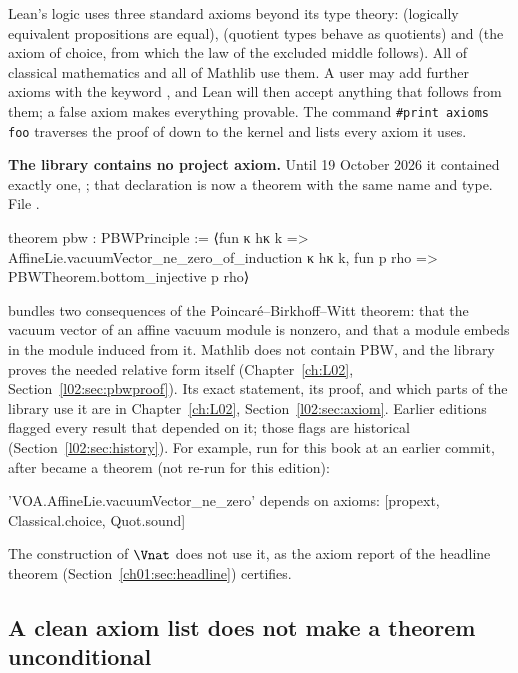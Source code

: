 Lean's logic uses three standard axioms beyond its type theory:  (logically equivalent
propositions are equal),  (quotient types behave as quotients) and
 (the axiom of choice, from which the law of the excluded middle follows).
All of classical mathematics and all of Mathlib use them. A user may add further axioms with the
keyword , and Lean will then accept anything that follows from them; a false axiom makes
everything provable. The command \texttt{\#print axioms foo} traverses the proof of  down
to the kernel and lists every axiom it uses.

\textbf{The library contains no project axiom.} Until 19 October 2026 it
contained exactly one, ; that declaration is now a theorem with the same name and type.
\noindent File .
\begin{leancode}
theorem pbw : PBWPrinciple :=
  ⟨fun κ hκ k => AffineLie.vacuumVector_ne_zero_of_induction κ hκ k,
    fun p rho => PBWTheorem.bottom_injective p rho⟩
\end{leancode}
 bundles two consequences of the Poincar\'e--Birkhoff--Witt theorem: that the
vacuum vector of an affine vacuum module is nonzero, and that a module embeds in the module induced
from it. Mathlib does not contain PBW, and the library proves the needed relative form itself
(Chapter~\ref{ch:L02}, Section~\ref{l02:sec:pbwproof}). Its exact statement, its proof, and which
parts of the library use it are in Chapter~\ref{ch:L02}, Section~\ref{l02:sec:axiom}. Earlier
editions flagged every result that depended on it; those flags are historical
(Section~\ref{l02:sec:history}). For example, run for this book at an earlier commit, after  became a theorem (not re-run for this edition):
\begin{plaincode}
'VOA.AffineLie.vacuumVector_ne_zero' depends on axioms: [propext, Classical.choice, Quot.sound]
\end{plaincode}
The construction of $\Vnat$ does not use it, as the axiom report of the headline theorem
(Section~\ref{ch01:sec:headline}) certifies.

\subsection{A clean axiom list does not make a theorem unconditional}\label{ch01:sec:uncond}

